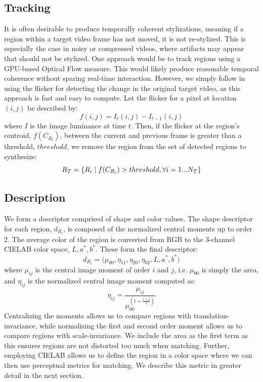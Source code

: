 \documentclass[a4paper,11pt,final]{ThesisStyle}
\newcommand{\suchthat}{\;\ifnum\currentgrouptype=16 \middle\fi|\;}
\begin{document}
\subsection{Tracking}\vspace{-0.4em}
It is often desirable to produce temporally coherent stylizations, meaning if a region within a target video frame has not moved, it is not re-stylized.  This is especially the case in noisy or compressed videos, where artifacts may appear that should not be stylized.  One approach would be to track regions using a GPU-based Optical Flow measure.  This would likely produce reasonable temporal coherence without sparing real-time interaction.  However, we simply follow \cite{Hertzmann2000} in using the flicker for detecting the change in the original target video, as this approach is fast and easy to compute.  Let the flicker for a pixel at location $(i,j)$ be described by:
\begin{equation}
f(i,j) = I_t(i,j) - I_{t-1}(i,j)
\end{equation} 
where $I$ is the image luminance at time $t$.  Then, if the flicker at the region's centroid, $f(C_{R_i})$, between the current and previous frame is greater than a threshold, $threshold$, we remove the region from the set of detected regions to synthesize:
\begin{equation}
R_T = \{ R_i \suchthat f(C_{R_i}) > threshold, \forall i = 1...N_T \}
\end{equation}
\subsection{Description}\vspace{-0.4em}
We form a descriptor comprised of shape and color values.  The shape descriptor for each region, $d_{R_i}$, is composed of the normalized central moments up to order 2.  The average color of the region is converted from RGB to the 3-channel CIELAB color space, $L, a^{*}, b^{*}$.  These form the final descriptor: 
\begin{equation}
d_{R_i} = \Big(\mu_{00}, \eta_{11}, \eta_{20}, \eta_{02}, L, a^{*}, b^{*}\Big)
\end{equation}
where $\mu_{ij}$ is the central image moment of order $i$ and $j$, i.e. $\mu_{00}$ is simply the area, and $\eta_{ij}$ is the normalized central image moment computed as: 
\begin{equation}
\eta_{ij} = \frac{\mu_{ij}}{\mu_{00}^{\left(1 + \frac{i+j}{2}\right)}}
\end{equation}
Centralizing the moments allows us to compare regions with translation-invariance, while normalizing the first and second order moment allows us to compare regions with scale-invariance.  We include the area as the first term as this ensures regions are not distorted too much when matching.  Further, employing CIELAB allows us to define the region in a color space where we can then use perceptual metrics for matching.  We describe this metric in greater detail in the next section.
\end{document}
